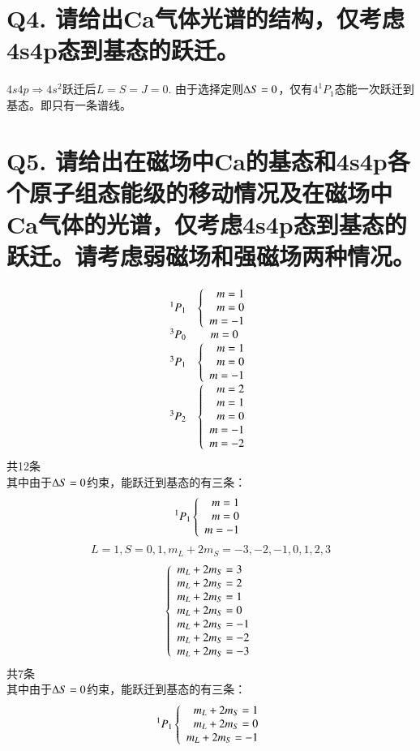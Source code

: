 \documentclass[UTF8,9pt]{ctexart}
\begin{document}
\section{Q4. 请给出Ca气体光谱的结构，仅考虑4s4p态到基态的跃迁。}
$4s4p\Rightarrow 4s^2$跃迁后$L=S=J=0$. 由于选择定则$\D S=0$，仅有$4^1P_1$态能一次跃迁到基态。即只有一条谱线。
\section{Q5. 请给出在磁场中Ca的基态和4s4p各个原子组态能级的移动情况及在磁场中Ca气体的光谱，仅考虑4s4p态到基态的跃迁。请考虑弱磁场和强磁场两种情况。}
    $$\ar[lc]{
        {}^1P_1&\left\{\ar{
            m=1\\
            m=0\\
            m=-1
        }\right.\\
        {}^3P_0& m=0\\
        {}^3P_1&\left\{\ar{
            m=1\\
            m=0\\
            m=-1
        }\right.\\
        {}^3P_2&\left\{\ar{
            m=2\\
            m=1\\
            m=0\\
            m=-1\\
            m=-2
        }\right.
    }$$
    共12条\\
    其中由于$\D S=0$约束，能跃迁到基态的有三条：
    $${}^1P_1\left\{\ar{
        m=1\\
        m=0\\
        m=-1
    }\right.$$
    $$L=1, S=0,1, m_L+2m_S=-3,-2,-1,0,1,2,3$$
    $$\left\{\ar[lc]{
        m_L+2m_S=3\\
        m_L+2m_S=2\\
        m_L+2m_S=1\\
        m_L+2m_S=0\\
        m_L+2m_S=-1\\
        m_L+2m_S=-2\\
        m_L+2m_S=-3\\
    }\right.$$
    共7条\\
    其中由于$\D S=0$约束，能跃迁到基态的有三条：
    $${}^1P_1\left\{\ar{
        m_L+2m_S=1\\
        m_L+2m_S=0\\
        m_L+2m_S=-1\\
    }\right.$$
\end{document}
